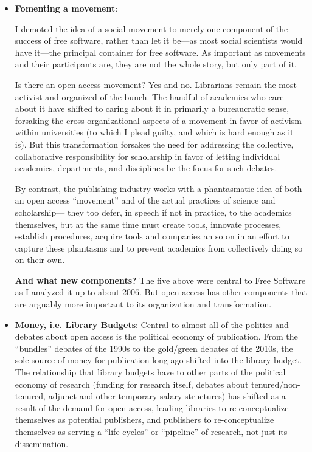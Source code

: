 \documentclass[11pt]{article}
\begin{document}
\begin{itemize}
\item \textbf{Fomenting a movement}:
\label{sec:org76a7369}

I demoted the idea of a social movement to merely one component of the success of free software, rather than let it be---as most social scientists would have it---the principal container for free software.  As important as movements and their participants are, they are not the whole story, but only part of it.  

Is there an open access movement?  Yes and no.  Librarians remain the most activist and organized of the bunch.  The handful of academics who care about it have shifted to caring about it in primarily a bureaucratic sense, forsaking the cross-organizational aspects of a movement in favor of activism within universities (to which I plead guilty, and which is hard enough as it is).  But this transformation forsakes the need for addressing the collective, collaborative responsibility for scholarship in favor of letting individual academics, departments, and disciplines be the focus for such debates. 

By contrast, the publishing industry works with a phantasmatic idea of both an open access ``movement'' and of the actual practices of science and scholarship--- they too defer, in speech if not in practice, to the academics themselves, but at the same time must create tools, innovate processes, establish procedures, acquire tools and companies an so on in an effort to capture these phantasms and to prevent academics from collectively doing so on their own. 


\textbf{And what new components?}  The five above were central to Free Software as I analyzed it up to about 2006.  But open access has other components that are arguably more important to its organization and transformation.

\item \textbf{Money, i.e. Library Budgets}:
\label{sec:org10d5530}
Central to almost all of the politics and debates about open access is the political economy of publication.  From the ``bundles'' debates of the 1990s to the gold/green debates of the 2010s, the sole source of money for publication long ago shifted into the library budget. The relationship that library budgets have to other parts of the political economy of research (funding for research itself, debates about tenured/non-tenured, adjunct and other temporary salary structures) has shifted as a result of the demand for open access, leading libraries to re-conceptualize themselves as potential publishers, and publishers to re-conceptualize themselves as serving a ``life cycles'' or ``pipeline'' of research, not just its dissemination.


\end{itemize}
\end{document}
